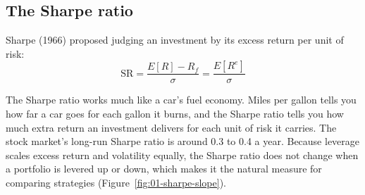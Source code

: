 \subsection{The Sharpe ratio}
\label{sec:01-sharpe}

Sharpe (1966) proposed judging an investment by its excess return per unit of risk:
\begin{equation}
  \mathrm{SR} = \frac{E[R] - R_f}{\sigma} = \frac{E[R^{e}]}{\sigma}
  \label{eq:01-sr}
\end{equation}

The Sharpe ratio works much like a car's fuel economy. Miles per gallon tells you how far a car goes for each gallon it burns, and the Sharpe ratio tells you how much extra return an investment delivers for each unit of risk it carries. The stock market's long-run Sharpe ratio is around 0.3 to 0.4 a year. Because leverage scales excess return and volatility equally, the Sharpe ratio does not change when a portfolio is levered up or down, which makes it the natural measure for comparing strategies (Figure~\ref{fig:01-sharpe-slope}).



